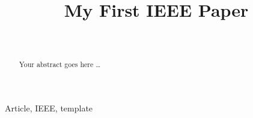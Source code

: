 \documentclass[journal,twocolumn,letterpaper,10pt]{ieee-sty/IEEEtran}
\begin{document}
\newcommand {\GSAuthor} {Graduate~Student~Name}

\def \AuthorA{
    Ziqiang~Cui,~\IEEEmembership{Member,~IEEE,}
    \GSAuthor,
    Huaxiang~Wang,~\IEEEmembership{Senior~Member,~IEEE}%
\thanks{This research is financially supported by NSFC, Nos. 61671319 and 61627803.}%
\thanks{Manuscript received August 19, 2019; revised August 26, 2019.}}







\title{My First IEEE Paper}

\author{\Authors\\
        \Institutions}

\maketitle

\begin{abstract}
Your abstract goes here \ldots
\end{abstract}


\begin{IEEEkeywords}
Article, IEEE, template
\end{IEEEkeywords}







\if{}


\fi
\end{document}
